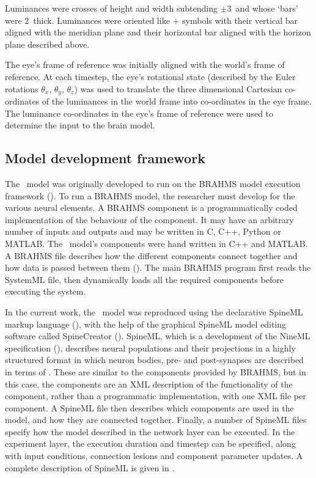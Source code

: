 \documentclass{frontiersSCNS}
\begin{document}
Luminances were crosses of height and width subtending $\pm$3\dg~and whose
`bars' were 2\dg~thick. Luminances were oriented like $+$ symbols with
their vertical bar aligned with the meridian plane and their horizontal bar
aligned with the horizon plane described above.

The eye's frame of reference was initially aligned with the world's frame
of reference.
At each timestep, the eye's rotational state (described by the Euler
rotations $\theta_x$, $\theta_y$, $\theta_z$) was
used to translate the three dimensional
Cartesian co-ordinates of the luminances in the world frame into co-ordinates
in the eye frame. The luminance co-ordinates in the eye's frame of reference
were used to determine the input to the brain model.

\subsection{Model development framework}

The \ccg~model was originally developed to run on the BRAHMS model
execution framework
(\cite{mitchinson_brahms:_2010,mitchinson_brahms_2015}). To run a
BRAHMS model, the researcher must develop  for
the various neural elements. A BRAHMS component is a programmatically
coded implementation of the behaviour of the component. It may have an
arbitrary number of inputs and outputs and may be written in C, C++,
Python or MATLAB. The \ccg~model's components were hand written in C++
and MATLAB. A BRAHMS  file describes how the different
components connect together and how data is passed between them
(\cite{mitchinson_brahms:_2010}). The main BRAHMS program first
reads the SystemML file, then dynamically loads all the required
components before executing the system.

In the current work, the \ccg~model was reproduced using the
declarative SpineML markup language (\cite{richmond_model_2014}),
with the help of the graphical SpineML model editing software
called SpineCreator
(\cite{cope_spinecreator:_2016}). SpineML,
which is a development of the NineML specification
(\cite{incf_task_force_on_multi-scale_modeling_network_2011}),
describes neural populations and their projections in a highly
structured format in which neuron bodies, pre- and post-synapses are
described in terms of . These are similar to the
components provided by BRAHMS, but in this case, the components are an
XML description of the functionality of the component, rather than a
programmatic implementation, with one XML file per component. A
SpineML  file then describes which components are
used in the model, and how they are connected together. Finally, a
number of SpineML  files specify how the model
described in the network layer can be executed. In the experiment
layer, the execution duration and timestep can be specified, along
with input conditions, connection lesions and component parameter
updates. A complete description of SpineML is given
in \cite{richmond_model_2014}.
\end{document}
